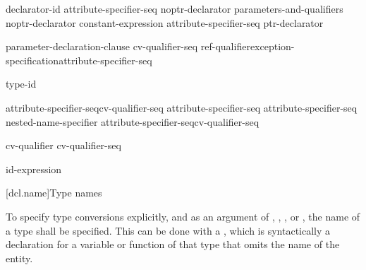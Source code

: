 \begin{bnf}
\br
    declarator-id attribute-specifier-seq\opt\br
    noptr-declarator parameters-and-qualifiers\br
    noptr-declarator \terminal{[} constant-expression\opt{} \terminal{]} attribute-specifier-seq\opt\br
    \terminal{(} ptr-declarator \terminal{)}
\end{bnf}

\begin{bnf}
\br
    \terminal{(} parameter-declaration-clause \terminal{)} cv-qualifier-seq\opt\br
\hspace*{\bnfindentinc}ref-qualifier\opt exception-specification\opt attribute-specifier-seq\opt
\end{bnf}

\begin{bnf}
\br
    \terminal{->} type-id
\end{bnf}

\begin{bnf}
\br
    \terminal{*} attribute-specifier-seq\opt cv-qualifier-seq\opt\br
    \terminal{\&} attribute-specifier-seq\opt\br
    \terminal{\&\&} attribute-specifier-seq\opt\br
    nested-name-specifier \terminal{*} attribute-specifier-seq\opt cv-qualifier-seq\opt
\end{bnf}

\begin{bnf}
\br
    cv-qualifier cv-qualifier-seq\opt
\end{bnf}

\begin{bnf}
\br
    \br
\end{bnf}

\begin{bnf}
\br
    \terminal{\&}\br
    \terminal{\&\&}
\end{bnf}

\begin{bnf}
\br
    \opt id-expression
\end{bnf}

[dcl.name]{Type names}

\pnum
{}%
To specify type conversions explicitly,
%
and as an argument of
,
,
,
or
,
the name of a type shall be specified.
This can be done with a
,
which is syntactically a declaration for a variable or function
of that type that omits the name of the entity.

